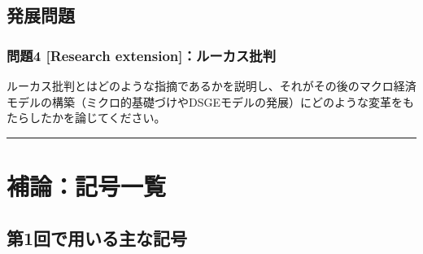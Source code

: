 \documentclass[
  japanese,
  lualatex,
  ja=standard,
  12pt,
  a4paper]{ltjsarticle}
\begin{document}
\subsection{発展問題}\label{ux767aux5c55ux554fux984c}

\subsubsection{問題4 {[}Research
extension{]}：ルーカス批判}\label{ux554fux984c4-research-extensionux30ebux30fcux30abux30b9ux6279ux5224}

ルーカス批判とはどのような指摘であるかを説明し、それがその後のマクロ経済モデルの構築（ミクロ的基礎づけやDSGEモデルの発展）にどのような変革をもたらしたかを論じてください。

\begin{center}\rule{0.5\linewidth}{0.5pt}\end{center}

\section{補論：記号一覧}\label{ux88dcux8ad6ux8a18ux53f7ux4e00ux89a7}

\subsection{第1回で用いる主な記号}\label{ux7b2c1ux56deux3067ux7528ux3044ux308bux4e3bux306aux8a18ux53f7}
\end{document}
